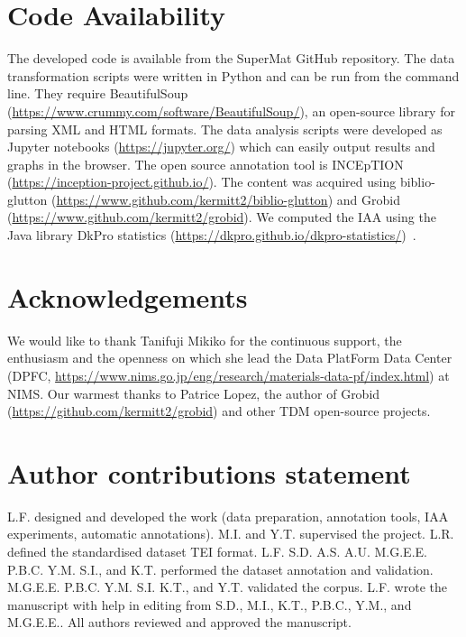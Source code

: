 \documentclass[fleqn,10pt]{wlscirep}
\begin{document}
\section*{Code Availability}
\label{sec:code-availability}
The developed code is available from the SuperMat GitHub repository. The data transformation scripts were written in Python and can be run from the command line. 
They require BeautifulSoup  (\url{https://www.crummy.com/software/BeautifulSoup/}), an open-source library for parsing XML and HTML formats. 
The data analysis scripts were developed as Jupyter notebooks (\url{https://jupyter.org/}) which can easily output results and graphs in the browser. 
The open source annotation tool is INCEpTION (\url{https://inception-project.github.io/}). 
The content was acquired using biblio-glutton (\url{https://www.github.com/kermitt2/biblio-glutton}) and Grobid (\url{https://www.github.com/kermitt2/grobid}).
We computed the IAA using the Java library DkPro statistics (\url{https://dkpro.github.io/dkpro-statistics/})~\cite{Meyer2014DKProAA}.

  

\section*{Acknowledgements}

We would like to thank Tanifuji Mikiko for the continuous support, the enthusiasm and the openness on which she lead the Data PlatForm Data Center (DPFC, \url{https://www.nims.go.jp/eng/research/materials-data-pf/index.html}) at NIMS.
Our warmest thanks to Patrice Lopez, the author of Grobid (\url{https://github.com/kermitt2/grobid}) and other TDM open-source projects. 

\section*{Author contributions statement}

L.F. designed and developed the work (data preparation, annotation tools, IAA experiments, automatic annotations). M.I. and Y.T. supervised the project.
L.R. defined the standardised dataset TEI format.
L.F. S.D. A.S. A.U. M.G.E.E. P.B.C. Y.M. S.I., and K.T. performed the dataset annotation and validation.
M.G.E.E. P.B.C. Y.M. S.I. K.T., and Y.T. validated the corpus.
L.F. wrote the manuscript with help in editing from S.D., M.I., K.T., P.B.C., Y.M., and  M.G.E.E.. 
All authors reviewed and approved the manuscript. 
\end{document}
